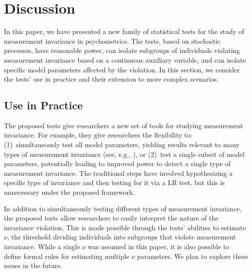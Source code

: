 \documentclass[man]{apa}
\begin{document}
\section{Discussion}
In this paper, we have presented a new family of statistical tests for
the study of measurement invariance in psychometrics.  The tests,
based on stochastic processes, have reasonable power, can isolate
subgroups of individuals violating measurement invariance based on a
continuous auxiliary variable, and can
isolate specific model parameters affected by the violation.  In this
section, we consider the tests' use in practice and their 
extension to more complex scenarios.

\subsection{Use in Practice}
The proposed tests give researchers a new set of tools for studying 
measurement invariance.  For example, they give researchers the
flexibility to: (1)~simultaneously test all model parameters, yielding
results relevant to many types of measurement
invariance (see, e.g., ), or (2)~test a single subset of
model parameters, potentially leading to improved power to detect a
single type of measurement invariance.  The traditional
steps have involved hypothesizing a specific type of invariance and
then testing for it via a LR test, but this is
unnecessary under the proposed framework.

In addition to simultaneously testing different types of measurement
invariance, the proposed tests allow researchers to easily interpret
the nature of the invariance violation.  This is made possible through
the tests' abilities to estimate $\nu$, the threshold dividing
individuals into subgroups that violate
measurement invariance.  While a single $\nu$ was assumed in this
paper, it is also possible to define 
formal rules for estimating multiple $\nu$ parameters.  We plan to
explore these issues in the future.

\end{document}
